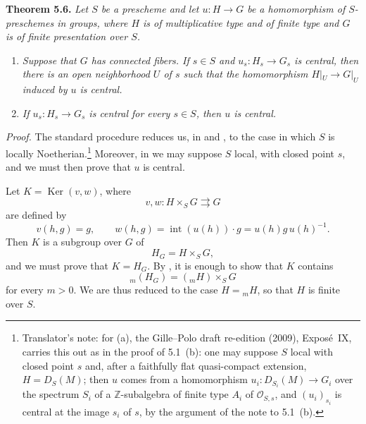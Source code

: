 \medskip
\noindent{}\textbf{Theorem 5.6.}
\textit{Let \(S\) be a prescheme and let \(u:H\to G\) be a homomorphism
of \(S\)-preschemes in groups, where \(H\) is of multiplicative type and
of finite type and \(G\) is of finite presentation over \(S\).}
\begin{enumerate}
  \item[(a)]
  \textit{Suppose that \(G\) has connected fibers. If \(s\in S\) and
  \(u_s:H_s\to G_s\) is central, then there is an open neighborhood
  \(U\) of \(s\) such that the homomorphism \(H|_U\to G|_U\) induced by
  \(u\) is central.}

  \item[(b)]
  \textit{If \(u_s:H_s\to G_s\) is central for every \(s\in S\), then
  \(u\) is central.}
\end{enumerate}

\emph{Proof.}
The standard procedure reduces us, in
 and
, to the case in which \(S\)
is locally Noetherian.\footnote{Translator's note: for (a), the
Gille--Polo draft re-edition (2009), Expos\'e~IX, carries this out as in
the proof of 5.1~(b): one may suppose \(S\) local with closed point \(s\)
and, after a faithfully flat quasi-compact extension, \(H=D_S(M)\); then
\(u\) comes from a homomorphism \(u_i:D_{S_i}(M)\to G_i\) over the
spectrum \(S_i\) of a \(\mathbb Z\)-subalgebra of finite type \(A_i\) of
\(\mathscr O_{S,s}\), and \((u_i)_{s_i}\) is central at the image \(s_i\)
of \(s\), by the argument of the note to 5.1~(b).} Moreover, in
 we may suppose \(S\) local,
with closed point \(s\), and we must then prove that \(u\) is central.

Let \(K=\operatorname{Ker}(v,w)\), where
\[
  v,w:H\times_SG\rightrightarrows G
\]
are defined by
\[
  v(h,g)=g,
  \qquad
  w(h,g)=\operatorname{int}(u(h))\cdot g
        =u(h)g\,u(h)^{-1}.
\]
Then \(K\) is a subgroup over \(G\) of
\[
  H_G=H\times_SG,
\]
and we must prove that \(K=H_G\). By
, it is enough to show that \(K\)
contains
\[
  {}_m(H_G)=({}_mH)\times_SG
\]
for every \(m>0\). We are thus reduced to the case \(H={}_mH\), so that
\(H\) is finite over \(S\).

